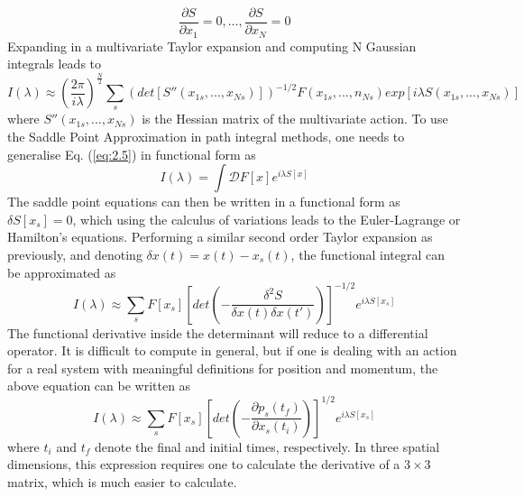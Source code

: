 \documentclass[11pt]{article}
\numberwithin{equation}{section}
\begin{document}
\begin{equation}
    \frac{\partial S}{\partial x_1} = 0, ... , \frac{\partial S}{\partial x_N} = 0
\end{equation}
Expanding in a multivariate Taylor expansion and computing N Gaussian integrals leads to
\begin{equation}
    I(\lambda) \approx \left ( \frac{2\pi}{i\lambda}\right )^{\frac{N}{2}} \sum_s (det[S''(x_{1s},...,x_{Ns})])^{-1/2} F(x_{1s},...,n_{Ns}) exp [i\lambda S(x_{1s},...,x_{Ns})]
\end{equation}
where $S''(x_{1s},...,x_{Ns})$ is the Hessian matrix of the multivariate action. 
\newline
To use the Saddle Point Approximation in path integral methods, one needs to generalise Eq. (\ref{eq:2.5}) in functional form as
\begin{equation}
    I(\lambda) = \int \mathcal{D} F[x] e^{i\lambda S[x]}
\end{equation}
The saddle point equations can then be written in a functional form as $\delta S[x_s] = 0$, which using the calculus of variations leads to the Euler-Lagrange or Hamilton's equations. Performing a similar second order Taylor expansion as previously, and denoting $\delta x(t) = x(t) - x_s(t)$, the functional integral can be approximated as 
\begin{equation}
    I(\lambda) \approx \sum_s F[x_s] \left [ det \left (- \frac{\delta^2 S}{\delta x(t) \delta x(t')}\right )\right ] ^ {-1/2} e^{i \lambda S[x_s]}
\end{equation}
The functional derivative inside the determinant will reduce to a differential operator. It is difficult to compute in general, but if one is dealing with an action for a real system with meaningful definitions for position and momentum, the above equation can be written as
\begin{equation}
    I(\lambda) \approx \sum_s F[x_s] \left [ det \left (- \frac{\partial p_s(t_f)}{\partial x_s(t_i)}\right )\right ] ^ {1/2} e^{i \lambda S[x_s]}
\end{equation}
where $t_i$ and $t_f$ denote the final and initial times, respectively. In three spatial dimensions, this expression requires one to calculate the derivative of a $3 \times 3$ matrix, which is much easier to calculate. 
\end{document}
